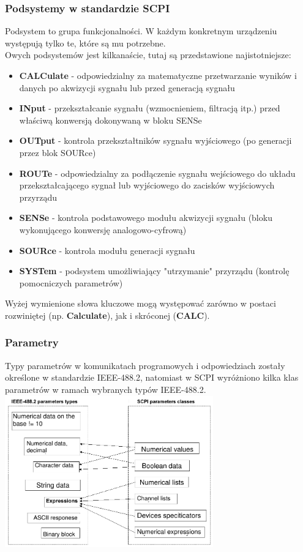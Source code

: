 \subsubsection{Podsystemy w standardzie SCPI}
Podsystem to grupa funkcjonalności. W każdym konkretnym urządzeniu występują tylko te, które są mu potrzebne.\\
Owych podsystemów jest kilkanaście, tutaj są przedstawione najistotniejsze:
\begin{itemize}
	\item \textbf{CALCulate} - odpowiedzialny za matematyczne przetwarzanie wyników i danych po akwizycji sygnału lub przed generacją sygnału
	\item \textbf{INput} - przekształcanie sygnału (wzmocnieniem, filtracją itp.) przed właściwą konwersją dokonywaną w bloku SENSe
	\item \textbf{OUTput} - kontrola przekształtników sygnału wyjściowego (po generacji przez blok SOURce)
	\item \textbf{ROUTe} - odpowiedzialny za podłączenie sygnału wejściowego do układu przekształcającego sygnał lub wyjściowego do zacisków wyjściowych przyrządu
	\item \textbf{SENSe} - kontrola podstawowego modułu akwizycji sygnału (bloku wykonującego konwersję analogowo-cyfrową)
	\item \textbf{SOURce} - kontrola modułu generacji sygnału
	\item \textbf{SYSTem} - podsystem umożliwiający "utrzymanie" przyrządu (kontrolę pomocniczych parametrów)
\end{itemize}

Wyżej wymienione słowa kluczowe mogą występować zarówno w postaci rozwiniętej (np. \textbf{Calculate}), jak i skróconej (\textbf{CALC}).

\subsubsection{Parametry}
Typy parametrów w komunikatach programowych i odpowiedziach zostały określone w standardzie IEEE-488.2, natomiast w SCPI wyróżniono kilka klas parametrów w ramach wybranych typów IEEE-488.2.\\
\includegraphics[width=9cm]{./wyklady/IEEE488_SCPI_30_1.pdf}

